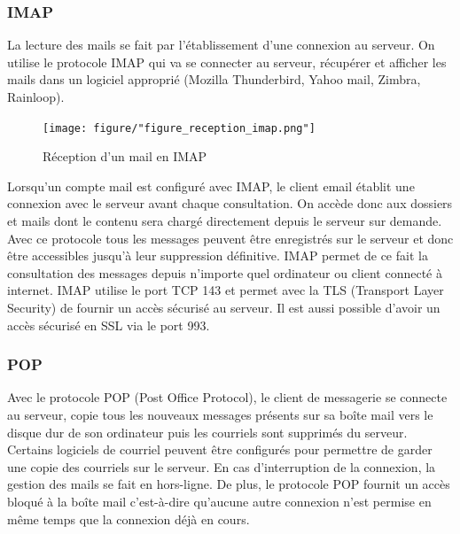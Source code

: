 \documentclass[a4paper,12pt,french]{report} %
\begin{document}
\subsubsection{IMAP}
La lecture des mails se fait par l'établissement d'une connexion au serveur. On utilise le protocole IMAP qui va se connecter au serveur, récupérer et afficher les mails dans un logiciel approprié (Mozilla Thunderbird, Yahoo mail, Zimbra, Rainloop).
\begin{figure}[H]
\centering
\texttt{[image: figure/"figure\_reception\_imap.png"]} 
\caption{Réception d'un mail en IMAP}
\label{Reception d'un mail en IMAP}
\end{figure}
Lorsqu’un compte mail est configuré avec IMAP, le client email établit une connexion avec le serveur avant chaque consultation. On accède donc aux dossiers et mails dont le contenu sera chargé directement depuis le serveur sur demande. Avec ce protocole tous les messages peuvent être enregistrés sur le serveur et donc être accessibles jusqu’à leur suppression définitive. IMAP permet de ce fait la consultation des messages depuis n’importe quel ordinateur ou client connecté à internet. IMAP utilise le port TCP 143 et permet avec la TLS (Transport Layer Security) de fournir un accès sécurisé au serveur. Il est aussi possible d’avoir un accès sécurisé en SSL via le port 993.
\subsubsection{POP}
Avec le protocole POP (Post Office Protocol), le client de messagerie se connecte au serveur, copie tous les nouveaux messages présents sur sa boîte mail vers le disque dur de son ordinateur puis les courriels sont supprimés du serveur. Certains logiciels de courriel peuvent être configurés pour permettre de garder une copie des courriels sur le serveur. En cas d’interruption de la connexion, la gestion des mails se fait en hors-ligne. De plus, le protocole POP fournit un accès bloqué à la boîte mail c’est-à-dire qu’aucune autre connexion n’est permise en même temps que la connexion déjà en cours.%
\end{document}
